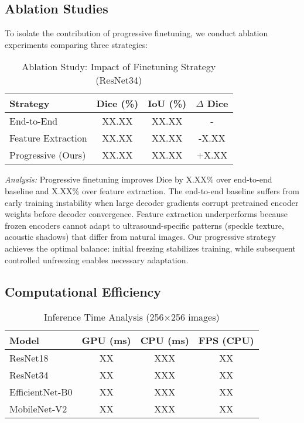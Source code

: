 \documentclass{article}
\begin{document}
\subsection{Ablation Studies}

To isolate the contribution of progressive finetuning, we conduct ablation experiments comparing three strategies:

\begin{table}[t]
\centering
\caption{Ablation Study: Impact of Finetuning Strategy (ResNet34)}
\label{tab:ablation}
\begin{tabular}{@{}lccc@{}}
\toprule
\textbf{Strategy} & \textbf{Dice (\%)} & \textbf{IoU (\%)} & \textbf{$\Delta$ Dice} \\
\midrule
End-to-End & XX.XX & XX.XX & - \\
Feature Extraction & XX.XX & XX.XX & -X.XX \\
Progressive (Ours) & XX.XX & XX.XX & +X.XX \\
\bottomrule
\end{tabular}
\end{table}

\textit{Analysis:} Progressive finetuning improves Dice by X.XX\% over end-to-end baseline and X.XX\% over feature extraction. The end-to-end baseline suffers from early training instability when large decoder gradients corrupt pretrained encoder weights before decoder convergence. Feature extraction underperforms because frozen encoders cannot adapt to ultrasound-specific patterns (speckle texture, acoustic shadows) that differ from natural images. Our progressive strategy achieves the optimal balance: initial freezing stabilizes training, while subsequent controlled unfreezing enables necessary adaptation.

\subsection{Computational Efficiency}

\begin{table}[t]
\centering
\caption{Inference Time Analysis (256$\times$256 images)}
\label{tab:inference}
\begin{tabular}{@{}lccc@{}}
\toprule
\textbf{Model} & \textbf{GPU (ms)} & \textbf{CPU (ms)} & \textbf{FPS (CPU)} \\
\midrule
ResNet18 & XX & XXX & XX \\
ResNet34 & XX & XXX & XX \\
EfficientNet-B0 & XX & XXX & XX \\
MobileNet-V2 & XX & XXX & XX \\
\bottomrule
\end{tabular}
\end{table}
\end{document}
